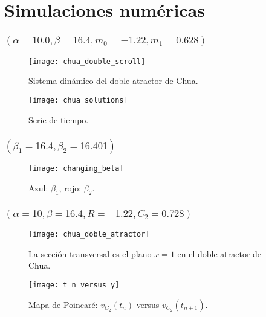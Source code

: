 \section{Simulaciones numéricas}

\begin{frame}
	\frametitle{\secname\quad$\left(\alpha=10.0, \beta=16.4, m_{0}=-1.22, m_{1}=0.628\right)$}

	\begin{minipage}{0.45\textwidth}
		\begin{figure}[ht!]
			\centering
			\texttt{[image: chua\_double\_scroll]}
			\caption{Sistema dinámico del doble atractor de Chua.}\label{fig:chua_double_scroll}
		\end{figure}
	\end{minipage}
	\begin{minipage}{0.45\textwidth}
		\begin{figure}[ht!]
			\centering
			\texttt{[image: chua\_solutions]}
			\caption{Serie de tiempo.}\label{fig:chua_solutions}
		\end{figure}
	\end{minipage}
\end{frame}

\begin{frame}
	\frametitle{\secname\quad$\left(\beta_{1}=16.4,\beta_{2}=16.401\right)$}

	\begin{figure}[ht!]
		\centering
		\texttt{[image: changing\_beta]}
		\caption{Azul: $\beta_{1}$, rojo: $\beta_{2}$.}\label{fig:lyapunov}
	\end{figure}

\end{frame}

\begin{frame}
	\frametitle{\secname\quad$\left(\alpha=10,\beta=16.4,R=-1.22,C_{2}=0.728\right)$}

	\begin{minipage}{0.45\textwidth}
		\begin{figure}[ht!]
			\centering
			\texttt{[image: chua\_doble\_atractor]}
			\caption{La sección transversal es el plano $x=1$ en el doble atractor de Chua.}\label{fig:chua_doble_atractor}
		\end{figure}
	\end{minipage}
	\begin{minipage}{0.45\textwidth}
		\begin{figure}[ht!]
			\centering
			\texttt{[image: t\_n\_versus\_y]}
			\caption{Mapa de Poincaré: $v_{C_{2}}\left(t_{n}\right)$ versus $v_{C_{2}}\left(t_{n+1}\right)$.}\label{fig:chua_solutions}
		\end{figure}
	\end{minipage}
\end{frame}

